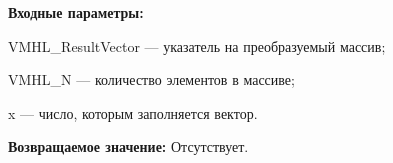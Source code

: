 \textbf{Входные параметры:}

 VMHL\_ResultVector --- указатель на преобразуемый массив;
 
 VMHL\_N --- количество элементов в массиве;
 
 x --- число, которым заполняется вектор.

\textbf{Возвращаемое значение:}
Отсутствует.